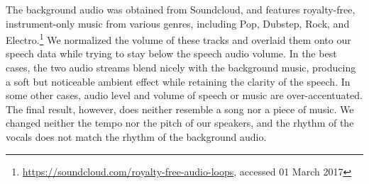 The background audio was obtained from Soundcloud, and features royalty-free, instrument-only music from various genres, including Pop, Dubstep, Rock, and Electro.\footnote{\url{https://soundcloud.com/royalty-free-audio-loops}, accessed 01 March 2017} We normalized the volume of these tracks and overlaid them onto our speech data while trying to stay below the speech audio volume. In the best cases, the two audio streams blend nicely with the background music, producing a soft but noticeable ambient effect while retaining the clarity of the speech. In some other cases, audio level and volume of speech or music are over-accentuated. The final result, however, does neither resemble a song nor a piece of music. We changed neither the tempo nor the pitch of our speakers, and the rhythm of the vocals does not match the rhythm of the background audio.

